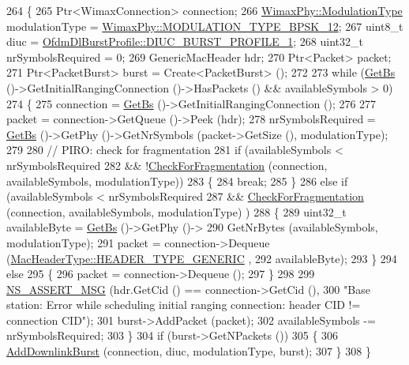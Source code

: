 \begin{DoxyCode}
264 \{
265   Ptr<WimaxConnection> connection;
266   \hyperlink{classns3_1_1WimaxPhy_a044c5d8a48ca992c39c2a946f6e755fa}{WimaxPhy::ModulationType} modulationType = 
      \hyperlink{classns3_1_1WimaxPhy_a044c5d8a48ca992c39c2a946f6e755faaef0b78541d9b66d4e85780131e665028}{WimaxPhy::MODULATION\_TYPE\_BPSK\_12};
267   uint8\_t diuc = \hyperlink{classns3_1_1OfdmDlBurstProfile_a4769c73985bf918ecd21180081471a00a7551a9c00acee92830f4d780803de0c0}{OfdmDlBurstProfile::DIUC\_BURST\_PROFILE\_1};
268   uint32\_t nrSymbolsRequired = 0;
269   GenericMacHeader hdr;
270   Ptr<Packet> packet;
271   Ptr<PacketBurst> burst = Create<PacketBurst> ();
272 
273   \textcolor{keywordflow}{while} (\hyperlink{classns3_1_1BSScheduler_a8b09065ac8f74cb35446af55128e41c7}{GetBs} ()->GetInitialRangingConnection ()->HasPackets () && availableSymbols > 0)
274     \{
275       connection = \hyperlink{classns3_1_1BSScheduler_a8b09065ac8f74cb35446af55128e41c7}{GetBs} ()->GetInitialRangingConnection ();
276 
277       packet = connection->GetQueue ()->Peek (hdr);
278       nrSymbolsRequired = \hyperlink{classns3_1_1BSScheduler_a8b09065ac8f74cb35446af55128e41c7}{GetBs} ()->GetPhy ()->GetNrSymbols (packet->GetSize (), modulationType);
279 
280       \textcolor{comment}{// PIRO: check for fragmentation}
281       \textcolor{keywordflow}{if} (availableSymbols < nrSymbolsRequired
282           && !\hyperlink{classns3_1_1BSScheduler_aedd94450afdda0371fae56e05624bfaf}{CheckForFragmentation} (connection, availableSymbols, modulationType))
283         \{
284           \textcolor{keywordflow}{break};
285         \}
286       \textcolor{keywordflow}{else} \textcolor{keywordflow}{if} (availableSymbols < nrSymbolsRequired
287                && \hyperlink{classns3_1_1BSScheduler_aedd94450afdda0371fae56e05624bfaf}{CheckForFragmentation} (connection, availableSymbols, modulationType)
      )
288         \{
289           uint32\_t availableByte = \hyperlink{classns3_1_1BSScheduler_a8b09065ac8f74cb35446af55128e41c7}{GetBs} ()->GetPhy ()->
290             GetNrBytes (availableSymbols, modulationType);
291           packet = connection->Dequeue (\hyperlink{classns3_1_1MacHeaderType_a54d8fc8bc93a2b7865627965cdd31c20a48fe5b2f20cadf78008c71469b518403}{MacHeaderType::HEADER\_TYPE\_GENERIC}
      ,
292                                         availableByte);
293         \}
294       \textcolor{keywordflow}{else}
295         \{
296           packet = connection->Dequeue ();
297         \}
298 
299       \hyperlink{assert_8h_aff5ece9066c74e681e74999856f08539}{NS\_ASSERT\_MSG} (hdr.GetCid () == connection->GetCid (),
300                      \textcolor{stringliteral}{"Base station: Error while scheduling initial ranging connection: header CID !=
       connection CID"});
301       burst->AddPacket (packet);
302       availableSymbols -= nrSymbolsRequired;
303     \}
304   \textcolor{keywordflow}{if} (burst->GetNPackets ())
305     \{
306       \hyperlink{classns3_1_1BSSchedulerRtps_ab58c3772737a8fcd20ec05680253b087}{AddDownlinkBurst} (connection, diuc, modulationType, burst);
307     \}
308 \}
\end{DoxyCode}


